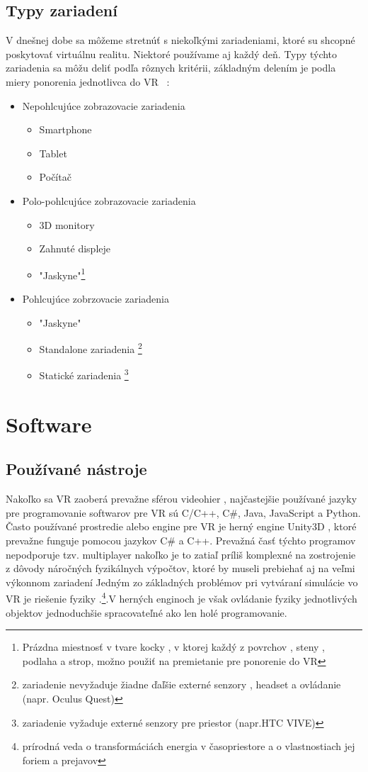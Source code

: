 \documentclass[10pt,twoside,slovak,a4paper]{article}										%
\begin{document}
\subsection{Typy zariadení} \label{VR:typy}
V dnešnej dobe sa môžeme stretnúť s niekoľkými zariadeniami, ktoré su shcopné poskytovať virtuálnu realitu. Niektoré používame aj každý deň.
Typy týchto zariadenia sa môžu deliť podľa rôznych kritérii, základným delením je podla miery ponorenia jednotlivca do VR ~\cite{types:zdroj}:
\begin{itemize}
\item Nepohlcujúce zobrazovacie zariadenia
	\begin{itemize}
	\item Smartphone       
	\item Tablet
	\item Počítač
	\end{itemize}	
\item Polo-pohlcujúce zobrazovacie zariadenia
	\begin{itemize}
	\item 3D monitory
	\item Zahnuté displeje
	\item "Jaskyne"\footnote{Prázdna miestnosť v tvare kocky , v ktorej každý z povrchov , steny , podlaha a strop, možno použiť na premietanie pre ponorenie do VR}
	\end{itemize}	
\item Pohlcujúce zobrzovacie zariadenia
	\begin{itemize}
	\item "Jaskyne"
	\item Standalone zariadenia \footnote{zariadenie nevyžaduje žiadne ďaľšie externé senzory , headset a ovládanie (napr. Oculus Quest)}
	\item Statické zariadenia \footnote {zariadenie vyžaduje externé senzory pre priestor (napr.HTC VIVE)}
	\end{itemize}
\end{itemize}

\section{Software} \label{SW}
\subsection{Používané nástroje} \label{SW:tools}
Nakoľko sa VR zaoberá prevažne sférou videohier , najčastejšie používané jazyky pre programovanie softwarov pre VR sú C/C++, C\#, Java, JavaScript a Python. Často používané prostredie alebo engine pre VR je herný engine Unity3D , ktoré prevažne funguje pomocou jazykov C\# a C++. Prevažná časť týchto programov nepodporuje tzv. multiplayer nakoľko je to zatiaľ príliš komplexné na zostrojenie z dôvody náročných fyzikálnych výpočtov, ktoré by museli prebiehať aj na veľmi výkonnom zariadení 
Jedným zo základných problémov pri vytváraní simulácie vo VR je riešenie fyziky .\footnote{ prírodná veda o transformáciách energia v časopriestore a o vlastnostiach jej foriem a prejavov}.V herných enginoch je však ovládanie fyziky jednotlivých objektov jednoduchšie spracovateľné ako len holé programovanie.
\end{document}
